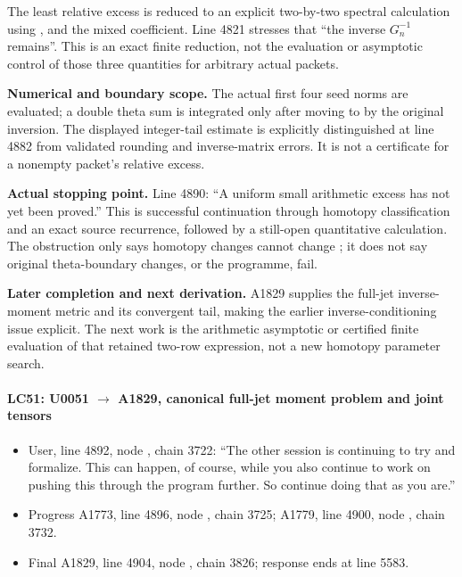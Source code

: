 The least relative excess is reduced to an explicit two-by-two spectral
calculation using \protect{},
\protect{} and the mixed coefficient. Line
4821 stresses that ``the inverse \(G_n^{-1}\) remains''. This is an
exact finite reduction, not the evaluation or asymptotic control of
those three quantities for arbitrary actual packets.

\textbf{Numerical and boundary scope.} The actual first four seed norms
are evaluated; a double theta sum is integrated only after moving
\protect{} to \protect{} by the original
inversion. The displayed integer-tail estimate is explicitly
distinguished at line 4882 from validated rounding and inverse-matrix
errors. It is not a certificate for a nonempty packet's relative excess.

\textbf{Actual stopping point.} Line 4890: ``A uniform small arithmetic
excess has not yet been proved.'' This is successful continuation
through homotopy classification and an exact source recurrence, followed
by a still-open quantitative calculation. The obstruction only says
homotopy changes cannot change \protect{}; it does not say
original theta-boundary changes, or the programme, fail.

\textbf{Later completion and next derivation.} A1829 supplies the
full-jet inverse-moment metric and its convergent tail, making the
earlier inverse-conditioning issue explicit. The next work is the
arithmetic asymptotic or certified finite evaluation of that retained
two-row expression, not a new homotopy parameter search.

\paragraph{\texorpdfstring{LC51: U0051
\allowbreak{}\ensuremath{→}\allowbreak{} A1829, canonical full-jet
moment problem and joint
tensors}{LC51: U0051  A1829, canonical full-jet moment problem and joint tensors}}\label{lc51-u0051-a1829-canonical-full-jet-moment-problem-and-joint-tensors}

\begin{itemize}
\tightlist
\item
  User, line 4892, node
  \protect{}, chain 3722: ``The
  other session is continuing to try and formalize. This can happen, of
  course, while you also continue to work on pushing this through the
  program further. So continue doing that as you are.''
\item
  Progress A1773, line 4896, node
  \protect{}, chain 3725;
  A1779, line 4900, node
  \protect{}, chain 3732.
\item
  Final A1829, line 4904, node
  \protect{}, chain 3826;
  response ends at line 5583.
\end{itemize}


